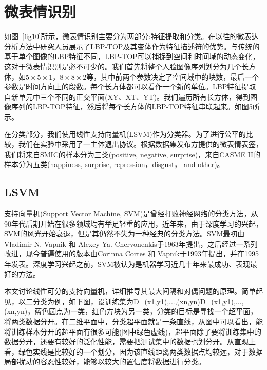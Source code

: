 \section{微表情识别}
如图~\ref{fig10}所示，微表情识别主要分为两部分:特征提取和分类。在以往的微表达分析方法中研究人员展示了LBP-TOP及其变体作为特征描述符的优势。与传统的基于单个图像的LBP特征不同，LBP-TOP可以捕捉到空间和时间域的动态变化，这对于微表情识别是必不可少的。我们首先将整个人脸图像序列划分为几个长方体，如$ 5\times5\times1 $，$ 8\times8\times2 $等，其中前两个参数决定了空间域中的块数，最后一个参数是时间方向上的段数。每个长方体都可以看作一个新的单位。LBP特征提取自新单元中三个不同的正交平面(XY、XT、YT)。我们遍历所有长方体，得到图像序列的LBP-TOP特征，然后将每个长方体的LBP-TOP特征串联起来。如图5所示。

在分类部分，我们使用线性支持向量机(LSVM)作为分类器\citep{chang2011libsvm}。为了进行公平的比较，我们在实验中采用了一主体退出协议。根据数据集发布方提供的微表情表签，我们将来自SMIC的样本分为三类(positive, negative, surprise)，来自CASME II的样本分为五类(happiness, surprise, repression，disgust， and other)。




\subsection{LSVM}

支持向量机(Support Vector Machine, SVM)是曾经打败神经网络的分类方法，从90年代后期开始在很多领域均有举足轻重的应用，近年来，由于深度学习的兴起，SVM的风光开始衰退，但是其仍然不失为一种经典的分类方法。SVM最初由 Vladimir N. Vapnik 和 Alexey Ya. Chervonenkis于1963年提出，之后经过一系列改进，现今普遍使用的版本由Corinna Cortes 和 Vapnik于1993年提出，并在1995年发表。深度学习兴起之前，SVM被认为是机器学习近几十年来最成功、表现最好的方法。

本文讨论线性可分的支持向量机，详细推导其最大间隔和对偶问题的原理。简单起见，以二分类为例，如下图，设训练集为D={(x1,y1),...,(xn,yn)}D={(x1,y1),...,(xn,yn)}，蓝色圆点为一类，红色方块为另一类，分类的目标是寻找一个超平面，将两类数据分开。在二维平面中，分类超平面就是一条直线，从图中可以看出，能将训练样本分开的超平面有很多可能(图中绿色虚线)，超平面除了要将训练集中的数据分开，还要有较好的泛化性能，需要把测试集中的数据也划分开。从直观上看，绿色实线是比较好的一个划分，因为该直线距离两类数据点均较远，对于数据局部扰动的容忍性较好，能够以较大的置信度将数据进行分类。



